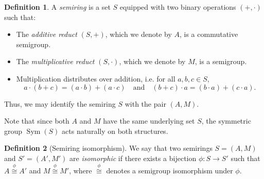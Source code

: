 \documentclass{article}
\theoremstyle{definition}
\newtheorem{definition}{Definition}
\begin{document}
\begin{definition}
    A \emph{semiring} is a set \(S\) equipped with two binary operations \((+, \cdot)\) such that:
    \begin{itemize}
        \item The \emph{additive reduct} \((S, +)\), which we denote by \(A\), is a commutative semigroup.
        \item The \emph{multiplicative reduct} \((S, \cdot)\), which we denote by \(M\), is a semigroup.
        \item Multiplication distributes over addition, i.e. for all \(a, b, c \in S\),
        \[
        a \cdot (b + c) = (a \cdot b) + (a \cdot c) \quad \text{and} \quad (b + c) \cdot a = (b \cdot a) + (c \cdot a).
        \]
    \end{itemize}
    Thus, we may identify the semiring \(S\) with the pair \((A, M)\).
\end{definition}
    Note that since both \(A\) and \(M\) have the same underlying set \(S\), the symmetric group \(\operatorname{Sym}(S)\) acts naturally on both structures.
\begin{definition}[Semiring isomorphism]
    We say that two semirings \(S = (A, M)\) and \(S' = (A', M')\) are \emph{isomorphic} if there exists a bijection \(\phi: S \to S'\) such that \(A \overset{\phi}\cong A'\) and \(M \overset{\phi}\cong M'\), where \(\overset{\phi}\cong\) denotes a semigroup isomorphism under \(\phi\).
\end{definition}
\end{document}
